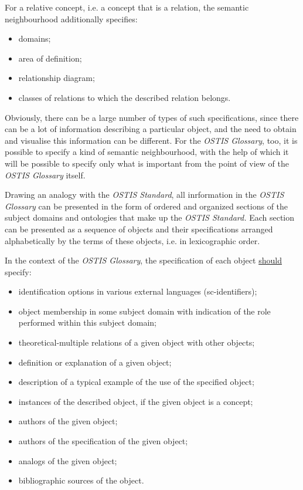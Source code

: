 \documentclass{scndocument}
\begin{document}
\begin{multicols}{2}
\begin{itemize}
\end{itemize}

\end{multicols}

\newpage

\begin{multicols}{2}
    For a relative concept, i.e. a concept that is a relation, the semantic neighbourhood additionally specifies:
\begin{itemize}
    \item domains;
    \item area of definition;
    \item relationship diagram;
    \item classes of relations to which the described relation belongs.
\end{itemize}

Obviously, there can be a large number of types of such specifications, since there can be a lot of information describing a particular object, and the need to obtain and visualise this information can be different. For the \textit{OSTIS Glossary}, too, it is possible to specify a kind of semantic neighbourhood, with the help of which it will be possible to specify only what is important from the point of view of the \textit{OSTIS Glossary} itself.

Drawing an analogy with the \textit{OSTIS Standard}, all inrformation in the \textit{OSTIS Glossary} can be presented in the form of ordered and organized sections of the subject domains and ontologies that make up the \textit{OSTIS
Standard.} Each section can be presented as a sequence of objects and their specifications arranged alphabetically by the terms of these objects, i.e. in lexicographic order.

In the context of the \textit{OSTIS Glossary}, the specification of each object \underline{should} specify:
\begin{itemize}
    \item identification options in various external languages (sc-identifiers);
    \item object membership in some subject domain with indication of the role performed within this subject domain;
    \item theoretical-multiple relations of a given object with other objects;
    \item definition or explanation of a given object;
    \item description of a typical example of the use of the specified object;
    \item instances of the described object, if the given object is a concept;
    \item authors of the given object;
    \item authors of the specification of the given object;
    \item analogs of the given object;
    \item bibliographic sources of the object.
    \end{itemize}


\end{multicols}
\end{document}
